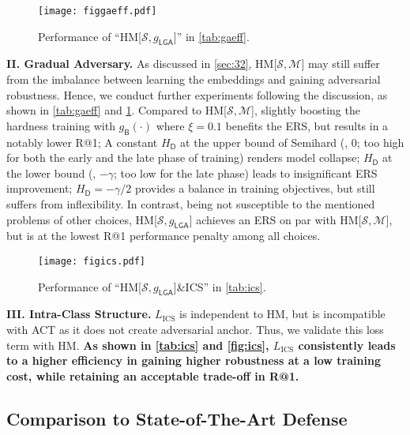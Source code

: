 \documentclass[10pt,twocolumn,letterpaper]{article}
\begin{document}
\begin{figure}[t]
	\vspace{-1em}
	\texttt{[image: figgaeff.pdf]}
	\vspace{-1.9em}
	\caption{Performance of ``HM[$\mathcal{S},g_\mathsf{LGA}$]'' in
	\cref{tab:gaeff}.}
	\label{fig:gaeff}
\end{figure}

\noindent\textbf{II. Gradual Adversary.}
%
As discussed in \cref{sec:32},  HM[$\mathcal{S},\mathcal{M}$] may still
suffer from the imbalance between learning the embeddings and gaining
adversarial robustness.
%
Hence, we conduct further experiments %
following the discussion, as shown in \cref{tab:gaeff} and \cref{fig:gaeff}.
%
Compared to HM[$\mathcal{S},\mathcal{M}$], slightly boosting the hardness
training with $g_\mathsf{B}(\cdot)$ where $\xi{=}0.1$ benefits the ERS, but
results in a notably lower R@1;
%
A constant $H_\mathsf{D}$ at the upper bound of Semihard (\ie, $0$; too high
for both the early and the late phase of training) renders model collapse;
%
$H_\mathsf{D}$ at the lower bound (\ie, $-\gamma$; too low for the late phase)
leads to insignificant ERS improvement;
%
$H_\mathsf{D}{=}-\gamma/2$ provides a balance in training objectives, but
still suffers from inflexibility.
%
In contrast, being not susceptible to the mentioned problems of other choices,
HM[$\mathcal{S},g_\mathsf{LGA}$] achieves an ERS on par with
HM[$\mathcal{S},\mathcal{M}$], but is at the lowest R@1 performance penalty among all choices.

\begin{figure}[t]
	\vspace{-1em}
	\texttt{[image: figics.pdf]}
	\vspace{-1.9em}
	\caption{Performance of ``HM[$\mathcal{S},g_\mathsf{LGA}$]\&ICS'' in \cref{tab:ics}.}
\end{figure}


\noindent\textbf{III. Intra-Class Structure.}
%
$L_\text{ICS}$ is independent to HM, but is incompatible with ACT as it does
not create adversarial anchor.
%
Thus, we validate this loss term with HM.
%
{\bf{As shown in \cref{tab:ics} and \cref{fig:ics}, $L_\text{ICS}$ consistently
leads to a higher efficiency in gaining higher robustness at a low training
cost, while retaining an acceptable trade-off in R@1.}}



\subsection{Comparison to State-of-The-Art Defense}
\label{sec:43}
\end{document}
